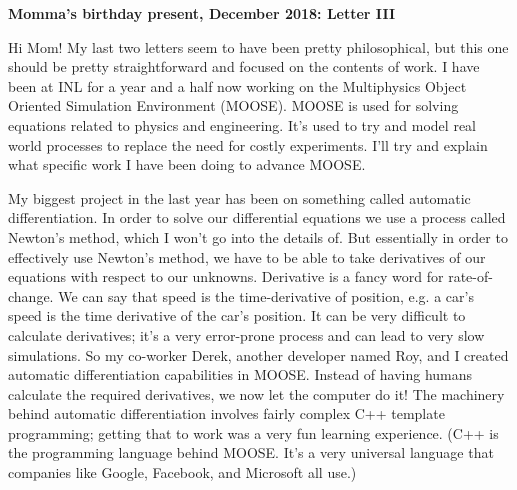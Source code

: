 \documentclass[11pt]{article}
\begin{document}
\onehalfspace
\textbf{Momma's birthday present, December 2018: Letter III}

Hi Mom! My last two letters seem to have been pretty philosophical, but this one
should be pretty straightforward and focused on the contents of work. I have
been at INL for a year and a half now working on the Multiphysics Object
Oriented Simulation Environment (MOOSE). MOOSE is used for solving equations
related to physics and engineering. It's used to try and model real world
processes to replace the need for costly experiments. I'll try and explain what
specific work I have been doing to advance MOOSE.

My biggest project in the last year has been on something called automatic
differentiation. In order to solve our differential equations we use a process
called Newton's method, which I won't go into the details of. But essentially in
order to effectively use Newton's method, we have to be able to take
derivatives of our equations with respect to our unknowns. Derivative is a fancy
word for rate-of-change. We can say that speed is the time-derivative of
position, e.g. a car's speed is the time derivative of the car's position. It
can be very difficult to calculate derivatives; it's a very error-prone process
and can lead to very slow simulations. So my co-worker Derek, another developer
named Roy, and I created automatic differentiation capabilities in
MOOSE. Instead of having humans calculate the required derivatives, we now let
the computer do it! The machinery behind automatic differentiation involves
fairly complex C++ template programming; getting that to work was a very fun
learning experience. (C++ is the programming language behind MOOSE. It's a very
universal language that companies like Google, Facebook, and Microsoft all use.)
\end{document}
